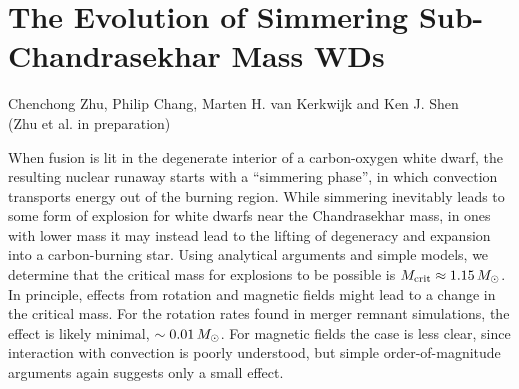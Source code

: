 \chapter{The Evolution of Simmering Sub-Chandrasekhar Mass WDs}
\label{ch:ch5}

\begin{center}
\begin{minipage}[c]{4.75in}
Chenchong Zhu, Philip Chang, Marten H. van Kerkwijk and Ken J. Shen\\
(Zhu et al. in preparation)
\vspace{2em}
\end{minipage}
\end{center}

When fusion is lit in the degenerate interior of a carbon-oxygen white dwarf, the resulting nuclear runaway starts with a ``simmering phase'', in which convection transports energy out of the burning region. 
While simmering inevitably leads to some form of explosion for white dwarfs near the Chandrasekhar mass, in ones with lower mass it may instead lead to the lifting of degeneracy and expansion into a carbon-burning star.
Using analytical arguments and simple models, we determine that the critical mass for explosions to be possible is {\charles $\Mcrit \approx 1.15\,\Msun$.}  In principle, effects from rotation and magnetic fields might lead to a change in the critical mass.  For the rotation rates found in merger remnant simulations, the effect is {\charles likely minimal, $\sim0.01\,\Msun$}.  For magnetic fields the case is less clear, since interaction with convection is poorly understood, but simple order-of-magnitude arguments again suggests only a small effect.
